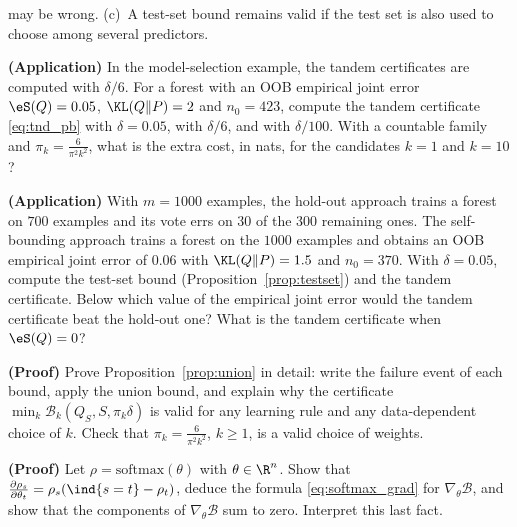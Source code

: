 \begin{exercises}
\begin{exercise}
may be wrong. (c)~A test-set bound remains valid if the test set is also used to choose
among several predictors.
\end{exercise}
\begin{exercise}
\textbf{(Application)} In the model-selection example, the tandem certificates are computed
with $\delta/6$. For a forest with an OOB empirical joint error $\eS(Q)=0.05$,
$\KL(Q\|P)=2$ and $n_0=423$, compute the tandem certificate \eqref{eq:tnd_pb} with
$\delta=0.05$, with $\delta/6$, and with $\delta/100$. With a countable family and
$\pi_k=\frac6{\pi^2k^2}$, what is the extra cost, in nats, for the candidates $k=1$ and $k=10$?
\end{exercise}
\begin{exercise}
\textbf{(Application)} With $m=1000$ examples, the hold-out approach trains a forest on
$700$ examples and its vote errs on $30$ of the $300$ remaining ones. The self-bounding
approach trains a forest on the $1000$ examples and obtains an OOB empirical joint error of
$0.06$ with $\KL(Q\|P)=1.5$ and $n_0=370$. With $\delta=0.05$, compute the test-set
bound (Proposition~\ref{prop:testset}) and the tandem certificate. Below which value of
the empirical joint error would the tandem certificate beat the hold-out one? What is the
tandem certificate when $\eS(Q)=0$?
\end{exercise}
\begin{exercise}
\textbf{(Proof)} Prove Proposition~\ref{prop:union} in detail: write the failure event of each
bound, apply the union bound, and explain why the certificate $\min_k\mathcal B_k(Q_S,S,\pi_k\delta)$
is valid for any learning rule and any data-dependent choice of $k$. Check that
$\pi_k=\frac{6}{\pi^2k^2}$, $k\geq1$, is a valid choice of weights.
\end{exercise}
\begin{exercise}
\textbf{(Proof)} Let $\rho=\mathrm{softmax}(\theta)$ with $\theta\in\R^n$. Show that
$\frac{\partial\rho_s}{\partial\theta_t}=\rho_s(\ind{s=t}-\rho_t)$, deduce the formula
\eqref{eq:softmax_grad} for $\nabla_\theta\mathcal B$, and show that the components of
$\nabla_\theta\mathcal B$ sum to zero. Interpret this last fact.
\end{exercise}
\end{exercises}
